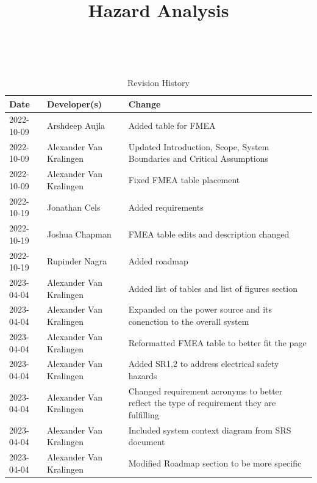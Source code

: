 \documentclass{article}
\title{Hazard Analysis\\\progname}
\author{\authname}
\date{}
\begin{document}
\maketitle
\thispagestyle{empty}

~\newpage


\begin{table}[hp]
\caption{Revision History} \label{TblRevisionHistory}
\begin{tabularx}{\textwidth}{llX}
\toprule
\textbf{Date} & \textbf{Developer(s)} & \textbf{Change}\\
\midrule
2022-10-09 & Arshdeep Aujla & Added table for FMEA\\
2022-10-09 & Alexander Van Kralingen & Updated Introduction, Scope, System Boundaries and Critical Assumptions\\
2022-10-09 & Alexander Van Kralingen & Fixed FMEA table placement\\
2022-10-19 & Jonathan Cels & Added requirements\\
2022-10-19 & Joshua Chapman & FMEA table edits and description changed\\
2022-10-19 & Rupinder Nagra & Added roadmap\\
2023-04-04 & Alexander Van Kralingen & Added list of tables and list of figures section\\
2023-04-04 & Alexander Van Kralingen & Expanded on the power source and its conenction to the overall system\\
2023-04-04 & Alexander Van Kralingen & Reformatted FMEA table to better fit the page\\
2023-04-04 & Alexander Van Kralingen & Added SR1,2 to address electrical safety hazards\\
2023-04-04 & Alexander Van Kralingen & Changed requirement acronyms to better reflect the type of requirement they are fulfilling\\
2023-04-04 & Alexander Van Kralingen & Included system context diagram from SRS document\\
2023-04-04 & Alexander Van Kralingen & Modified Roadmap section to be more specific\\
\bottomrule
\end{tabularx}
\end{table}

~\newpage

\tableofcontents

~\newpage

\end{document}
